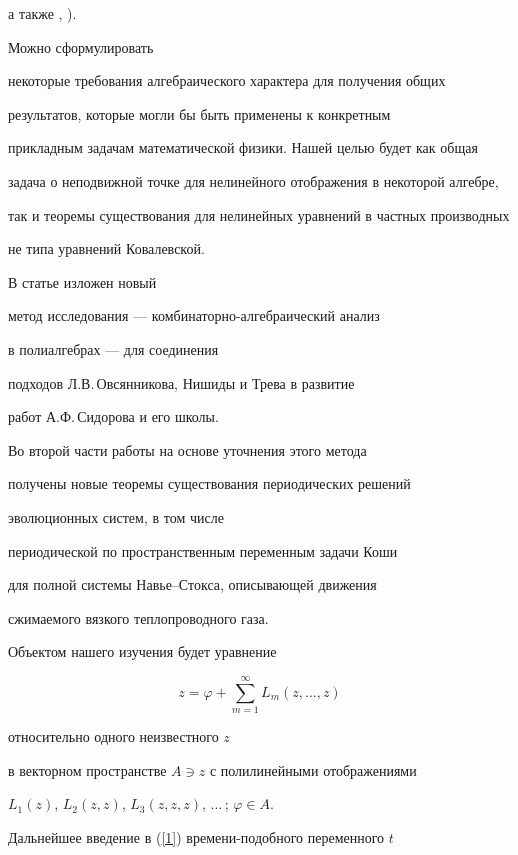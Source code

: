 а также \cite{Манин}, \cite{Malgrange}).





Можно сформулировать


некоторые требования алгебраического характера для получения общих


результатов, которые могли бы быть применены к конкретным


прикладным задачам математической физики. Нашей целью будет как общая


задача о неподвижной точке для нелинейного отображения в некоторой алгебре,


так и теоремы существования для нелинейных уравнений в частных производных


не типа уравнений Ковалевской.


В статье изложен новый


метод исследования --- комбинаторно-алгебраический анализ


в полиалгебрах --- для соединения


подходов Л.В.\,Овсянникова, Нишиды и Трева в развитие


работ А.Ф.\,Сидорова и его школы.


Во второй части работы на основе уточнения этого метода


получены новые теоремы существования периодических решений


эволюционных систем, в том числе


периодической по пространственным переменным задачи Коши


для полной системы Навье--Стокса, описывающей движения


сжимаемого вязкого теплопроводного газа.





Объектом нашего изучения будет уравнение


\begin{equation} \label{1}


z=\varphi+\sum_{m=1}^{\infty}L_m(z,\dotsc,z)


\end{equation}


относительно одного неизвестного $z$


в векторном пространстве $A\ni z$ с полилинейными отображениями


$L_1(z)$, $L_2(z,z)$, $ L_3(z,z,z)$, $\dotsc\,$; $\varphi\in A$.


Дальнейшее введение в (\ref{1}) времени-подобного переменного $t$



